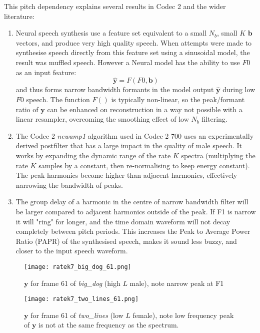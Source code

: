 \documentclass{article}
\begin{document}
This pitch dependency explains several results in Codec 2 and the wider literature:
\begin{enumerate}
\item Neural speech synthesis use a feature set equivalent to a small $N_b$, small $K$ $\mathbf{b}$ vectors, and produce very high quality speech.  When attempts were made to synthesise speech directly from this feature set using a sinusoidal model, the result was muffled speech. However a Neural model has the ability to use $F0$ as an input feature:
\begin{equation}
\hat{\mathbf{y}} = F(F0, \mathbf{b}) 
\end{equation}
and thus forms narrow bandwidth formants in the model output $\hat{\mathbf{y}}$ during low $F0$ speech. The function $F()$ is typically non-linear, so the peak/formant ratio of $\mathbf{y}$ can be enhanced on reconstruction in a way not possible with a linear resampler, overcoming the smoothing effect of low $N_b$ filtering. 

\item The Codec 2 \emph{newamp1} algorithm used in Codec 2 700 uses an experimentally derived postfilter that has a large impact in the quality of male speech.  It works by expanding the dynamic range of the rate $K$ spectra (multiplying the rate $K$ samples by a constant, then re-normalising to keep energy constant).  The peak harmonics become higher than adjacent harmonics, effectively narrowing the bandwidth of peaks.

\item The group delay of a harmonic in the centre of narrow bandwidth filter will be larger compared to adjacent harmonics outside of the peak.  If F1 is narrow it will "ring" for longer, and the time domain waveform will not decay completely between pitch periods.  This increases the Peak to Average Power Ratio (PAPR) of the synthesised speech, makes it sound less buzzy, and closer to the input speech waveform.

\end{enumerate}

\begin{figure}[h]
\caption{$\mathbf{y}$ for frame 61 of \emph{big\_dog} (high $L$ male), note narrow peak at F1 }
\label{fig:ratek7_big_dog_61}
\begin{center}
\texttt{[image: ratek7\_big\_dog\_61.png]}
\end{center}
\end{figure}

\begin{figure}[h]
\caption{$\mathbf{y}$ for frame 61 of \emph{two\_lines} (low $L$ female), note low frequency peak of $\mathbf{y}$ is not at the same frequency as the spectrum. }
\label{fig:ratek7_two_lines_61}
\begin{center}
\texttt{[image: ratek7\_two\_lines\_61.png]}
\end{center}
\end{figure}
\end{document}
